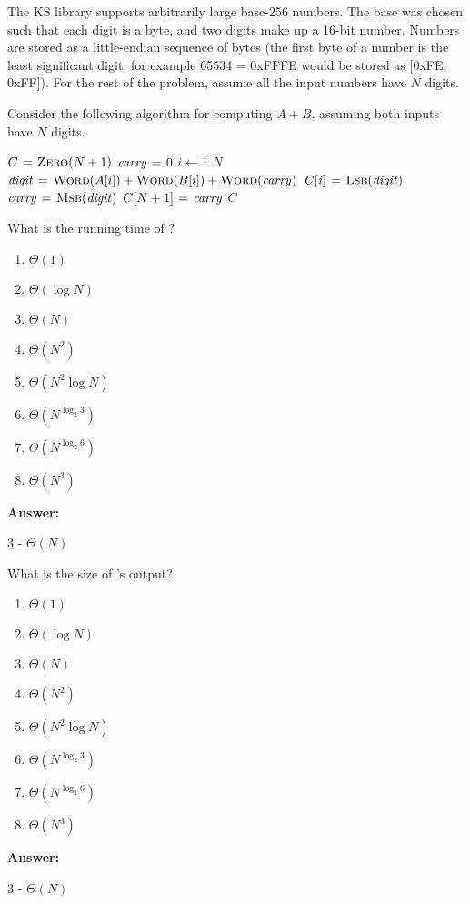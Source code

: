 \documentclass[12pt,twoside]{article}
\newcommand{\answer}{
 \par\medskip
 \textbf{Answer:}
}
\newcommand{\answerIa}{ \answer
3 - $\Theta(N)$
}
\newcommand{\answerIb}{ \answer
3 - $\Theta(N)$
}
\begin{document}
\begin{problems}
The KS library supports arbitrarily large base-256 numbers. The base was chosen
such that each digit is a byte, and two digits make up a 16-bit number. Numbers
are stored as a little-endian sequence of bytes (the first byte of a number is
the least significant digit, for example 65534 = 0xFFFE would be stored as
[0xFE, 0xFF]). For the rest of the problem, assume all the input numbers have
$N$ digits.

Consider the following algorithm for computing $A + B$, assuming both inputs
have $N$ digits.

\begin{codebox}
\li $C \mathrel{\hspace{1pt}=\hspace{1pt}} \textnormal{\scshape Zero}(N + 1)$ 
\li $\id{carry} \gets 0$
\li \For $i \gets 1$ \To $N$ \label{li:add-for}
\li   \Do
        $\id{digit} \gets \proc{Word}(A[i]) + \proc{Word}(B[i]) +
        \proc{Word}(\id{carry})$
\li     $\id{C[i]} \gets \proc{Lsb}(\id{digit})$
\li     $\id{carry} \gets \proc{Msb}(\id{digit})$
      \End
\li $C[N + 1] \gets \id{carry}$
\li \Return $C$
\end{codebox}

\begin{problemparts}
\problempart {} What is the running time of ?
\begin{enumerate}
  \item $\Theta(1)$
  \item $\Theta(\log N)$
  \item $\Theta(N)$
  \item $\Theta(N^2)$
  \item $\Theta(N^2 \log N)$
  \item $\Theta(N^{\log_2 3})$
  \item $\Theta(N^{\log_2 6})$
  \item $\Theta(N^3)$
\end{enumerate}
\answerIa

\problempart {} What is the size of 's output?
\begin{enumerate}
  \item $\Theta(1)$
  \item $\Theta(\log N)$
  \item $\Theta(N)$
  \item $\Theta(N^2)$
  \item $\Theta(N^2 \log N)$
  \item $\Theta(N^{\log_2 3})$
  \item $\Theta(N^{\log_2 6})$
  \item $\Theta(N^3)$
\end{enumerate}
\answerIb


\end{problemparts}
\end{problems}
\end{document}
